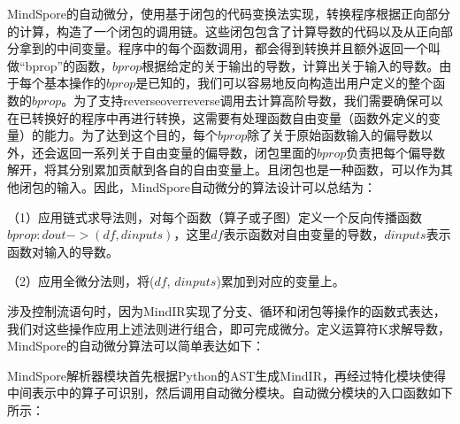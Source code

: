 \documentclass[letterpaper,10pt,english]{sphinxmanual}
\begin{document}
\sphinxAtStartPar
MindSpore的自动微分，使用基于闭包的代码变换法实现，转换程序根据正向部分的计算，构造了一个闭包的调用链。这些闭包包含了计算导数的代码以及从正向部分拿到的中间变量。程序中的每个函数调用，都会得到转换并且额外返回一个叫做“bprop”的函数，\(bprop\)根据给定的关于输出的导数，计算出关于输入的导数。由于每个基本操作的\(bprop\)是已知的，我们可以容易地反向构造出用户定义的整个函数的\(bprop\)。为了支持reverse\sphinxhyphen{}over\sphinxhyphen{}reverse调用去计算高阶导数，我们需要确保可以在已转换好的程序中再进行转换，这需要有处理函数自由变量（函数外定义的变量）的能力。为了达到这个目的，每个\(bprop\)除了关于原始函数输入的偏导数以外，还会返回一系列关于自由变量的偏导数，闭包里面的\(bprop\)负责把每个偏导数解开，将其分别累加贡献到各自的自由变量上。且闭包也是一种函数，可以作为其他闭包的输入。因此，MindSpore自动微分的算法设计可以总结为：

\sphinxAtStartPar
（1）应用链式求导法则，对每个函数（算子或子图）定义一个反向传播函数\(bprop: dout->(df, dinputs)\)，这里\(df\)表示函数对自由变量的导数，\(dinputs\)表示函数对输入的导数。

\sphinxAtStartPar
（2）应用全微分法则，将(\(df\), \(dinputs\))累加到对应的变量上。

\sphinxAtStartPar
涉及控制流语句时，因为MindIR实现了分支、循环和闭包等操作的函数式表达，我们对这些操作应用上述法则进行组合，即可完成微分。定义运算符K求解导数，MindSpore的自动微分算法可以简单表达如下：

\begin{sphinxVerbatim}[commandchars=\\\{\}]
\end{sphinxVerbatim}

\sphinxAtStartPar
MindSpore解析器模块首先根据Python的AST生成MindIR，再经过特化模块使得中间表示中的算子可识别，然后调用自动微分模块。自动微分模块的入口函数如下所示：
\end{document}
